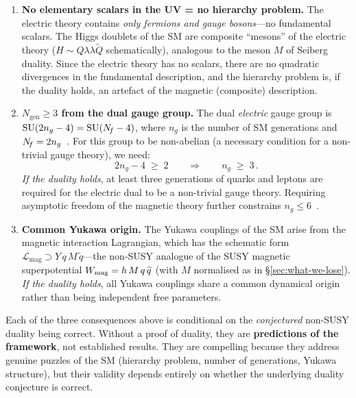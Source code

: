 \documentclass[11pt,a4paper]{article}
\begin{document}
\begin{enumerate}[label=(\alph*)]
  \item \textbf{No elementary scalars in the UV = no hierarchy
    problem.}  The electric theory contains \emph{only fermions and
    gauge bosons}---no fundamental scalars.  The Higgs doublets of
    the SM are composite ``mesons'' of the electric theory
    ($H \sim Q\lambda\lambda\widetilde{Q}$ schematically), analogous
    to the meson $M$ of Seiberg duality.  Since the electric theory
    has no scalars, there are no quadratic divergences in the
    fundamental description, and the hierarchy problem is, if the
    duality holds, an artefact of the magnetic (composite) description.

  \item \textbf{$N_{\mathrm{gen}} \geq 3$ from the dual gauge group.}
    The dual \emph{electric} gauge group is
    $\mathrm{SU}(2n_g - 4) = \mathrm{SU}(N_{\!f} - 4)$, where $n_g$ is the number of
    SM generations and $N_{\!f} = 2n_g$~\cite{Sannino2011}.  For this
    group to be non-abelian (a necessary condition for a
    non-trivial gauge theory), we need:
    \begin{equation}\label{eq:Ngen}
      2n_g - 4 \;\geq\; 2
      \qquad\Longrightarrow\qquad
      \boxed{n_g \;\geq\; 3\,.}
    \end{equation}
    \emph{If the duality holds}, at least three generations of quarks
    and leptons are required for the electric dual to be a non-trivial
    gauge theory.  Requiring asymptotic freedom of the magnetic theory
    further constrains $n_g \leq 6$~\cite{Sannino2011}.

  \item \textbf{Common Yukawa origin.}  The Yukawa couplings of the SM
    arise from the magnetic interaction Lagrangian, which has the
    schematic form $\mathcal{L}_{\mathrm{mag}} \supset
    Y\, q\, M\, \widetilde{q}$---the non-SUSY analogue of the SUSY
    magnetic superpotential $W_{\mathrm{mag}} = h\,M\,q\,\widetilde{q}$
    (with $M$ normalised as in \S\ref{sec:what-we-lose}).
    \emph{If the duality holds}, all Yukawa couplings share a common
    dynamical origin rather than being independent free parameters.
\end{enumerate}

\begin{remark}
  Each of the three consequences above is conditional on the
  \emph{conjectured} non-SUSY duality being correct.  Without a proof
  of duality, they are \textbf{predictions of the framework}, not
  established results.  They are compelling because they address
  genuine puzzles of the SM (hierarchy problem, number of
  generations, Yukawa structure), but their validity depends entirely
  on whether the underlying duality conjecture is correct.
\end{remark}
\end{document}
